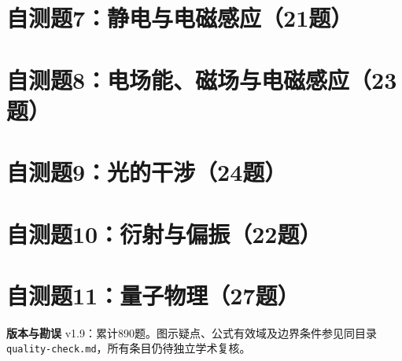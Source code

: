 \documentclass[lang=cn,color=blue,11pt]{elegantbook}
\begin{document}
\section{自测题7：静电与电磁感应（21题）}



\section{自测题8：电场能、磁场与电磁感应（23题）}



\section{自测题9：光的干涉（24题）}



\section{自测题10：衍射与偏振（22题）}



\section{自测题11：量子物理（27题）}



\par\medskip
\noindent\textbf{版本与勘误}\quad
v1.9：累计890题。图示疑点、公式有效域及边界条件参见同目录
\texttt{quality-check.md}，所有条目仍待独立学术复核。
\end{document}
